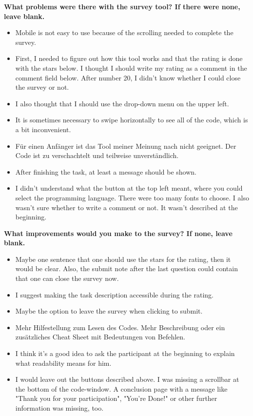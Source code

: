 \documentclass[%
class=scrreprt,
chapterprefix=false,%
open=right,%
twoside=false,%
paper=a4,%
logofile={Logo\_zentral\_farbig\_EN.png},%
thesistype=master,%
UKenglish,%
]{se2thesis}
\theoremstyle{definition}
\begin{document}
	\textbf{What problems were there with the survey tool? If there were none, leave blank.}
	\begin{itemize}
		\item Mobile is not easy to use because of the scrolling needed to complete the survey.
		\item First, I needed to figure out how this tool works and that the rating is done with the stars below. I thought I should write my rating as a comment in the comment field below. After number 20, I didn't know whether I could close the survey or not.
		\item I also thought that I should use the drop-down menu on the upper left.
		\item It is sometimes necessary to swipe horizontally to see all of the code, which is a bit inconvenient.
		\item Für einen Anfänger ist das Tool meiner Meinung nach nicht geeignet. Der Code ist zu verschachtelt und teilweise unverständlich.
		\item After finishing the task, at least a message should be shown.
		\item I didn't understand what the button at the top left meant, where you could select the programming language. There were too many fonts to choose. I also wasn't sure whether to write a comment or not. It wasn't described at the beginning.
	\end{itemize}

	\textbf{What improvements would you make to the survey? If none, leave blank.}
	\begin{itemize}
		\item Maybe one sentence that one should use the stars for the rating, then it would be clear. Also, the submit note after the last question could contain that one can close the survey now.
		\item I suggest making the task description accessible during the rating.
		\item Maybe the option to leave the survey when clicking to submit.
		\item Mehr Hilfestellung zum Lesen des Codes. Mehr Beschreibung oder ein zusätzliches Cheat Sheet mit Bedeutungen von Befehlen.
		\item I think it's a good idea to ask the participant at the beginning to explain what readability means for him.
		\item I would leave out the buttons described above. I was missing a scrollbar at the bottom of the code-window. A conclusion page with a message like "Thank you for your participation", "You're Done!" or other further information was missing, too.
	\end{itemize}
	
\end{document}
